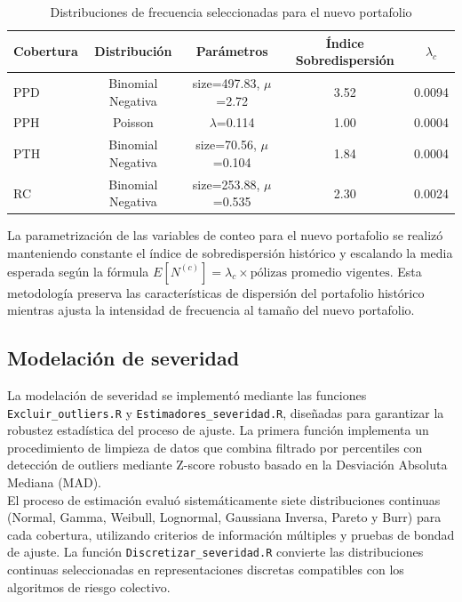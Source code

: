 \begin{table}[H]
\centering
\caption{Distribuciones de frecuencia seleccionadas para el nuevo portafolio}
\begin{tabular}{lcccc}
\hline
\textbf{Cobertura} & \textbf{Distribución} & \textbf{Parámetros} & \textbf{Índice Sobredispersión} & \textbf{$\lambda_c$} \\
\hline
PPD & Binomial Negativa & size=497.83, $\mu$=2.72 & 3.52 & 0.0094 \\
PPH & Poisson & $\lambda$=0.114 & 1.00 & 0.0004 \\
PTH & Binomial Negativa & size=70.56, $\mu$=0.104 & 1.84 & 0.0004 \\
RC & Binomial Negativa & size=253.88, $\mu$=0.535 & 2.30 & 0.0024 \\
\hline
\end{tabular}
\end{table}

La parametrización de las variables de conteo para el nuevo portafolio se realizó manteniendo constante el índice de sobredispersión histórico y escalando la media esperada según la fórmula $E[N^{(c)}] = \lambda_c \times \text{pólizas promedio vigentes}$. Esta metodología preserva las características de dispersión del portafolio histórico mientras ajusta la intensidad de frecuencia al tamaño del nuevo portafolio.


\subsection{Modelación de severidad}

La modelación de severidad se implementó mediante las funciones \texttt{Excluir\_outliers.R} y \texttt{Estimadores\_severidad.R}, diseñadas para garantizar la robustez estadística del proceso de ajuste. La primera función implementa un procedimiento de limpieza de datos que combina filtrado por percentiles con detección de outliers mediante Z-score robusto basado en la Desviación Absoluta Mediana (MAD).\\

El proceso de estimación evaluó sistemáticamente siete distribuciones continuas (Normal, Gamma, Weibull, Lognormal, Gaussiana Inversa, Pareto y Burr) para cada cobertura, utilizando criterios de información múltiples y pruebas de bondad de ajuste. La función \texttt{Discretizar\_severidad.R} convierte las distribuciones continuas seleccionadas en representaciones discretas compatibles con los algoritmos de riesgo colectivo.

